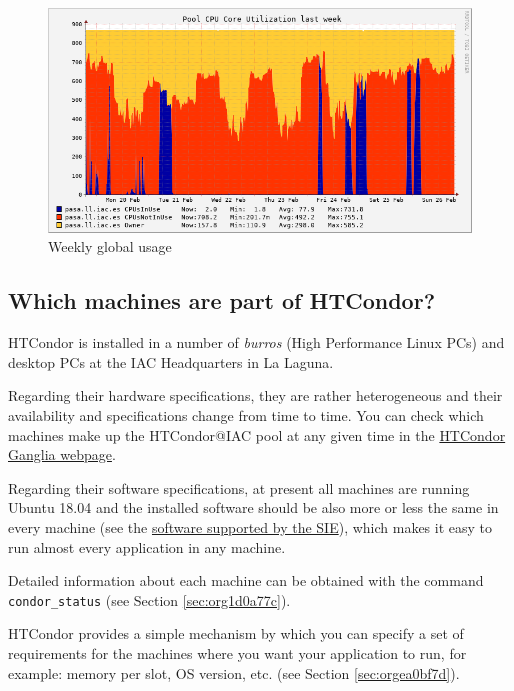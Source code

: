 \documentclass[a4paper,10pt]{article}
\begin{document}
\begin{figure}[htbp]
\centering
\includegraphics[width=.9\linewidth]{images/introduction/weekly_usage.png}
\caption{\label{fig:orgc51f1fc}
Weekly global usage}
\end{figure}

\subsection{Which machines are part of HTCondor?}
\label{sec:org8b81063}

HTCondor is installed in a number of \emph{burros} (High Performance Linux PCs) and
desktop PCs at the IAC Headquarters in La Laguna. 

Regarding their hardware specifications, they are rather heterogeneous and their
availability and specifications change from time to time. You can check which
machines make up the HTCondor@IAC pool at any given time in the \href{http://pasa/ganglia/?r=week\&cs=\&ce=\&c=IAC+HTCondor\&h=\&tab=m\&vn=\&hide-hf=false\&m=cpu\_num\&sh=1\&z=small\&hc=4\&host\_regex=\&max\_graphs=0\&s=by+name}{HTCondor Ganglia
webpage}. 

Regarding their software specifications, at present all machines are running
Ubuntu 18.04 and the installed software should be also more or less the same in
every machine (see the \href{http://research.iac.es/sieinvens/SINFIN/Main/software\_sinfin.php}{software supported by the SIE}), which makes it easy to
run almost every application in any machine.

Detailed information about each machine can be obtained with the command
\texttt{condor\_status} (see Section \ref{sec:org1d0a77c}). 

HTCondor provides a simple mechanism by which you can specify a set of
requirements for the machines where you want your application to run, for
example: memory per slot, OS version, etc. (see Section \ref{sec:orgea0bf7d}).
\end{document}
